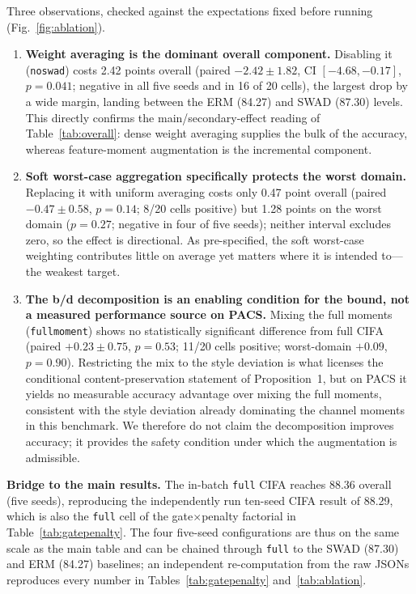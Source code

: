 \documentclass[electronics,article,submit,moreauthors]{Definitions/mdpi}
\newcommand{\add}[1]{\textcolor{addblue}{#1}}
\newcommand{\del}[1]{\textcolor{delred}{\st{#1}}}
\def\add#1{#1}%
\def\del#1{}%
\renewcommand{\add}[1]{#1}
\renewcommand{\del}[1]{}
\begin{document}
Three observations, checked against the expectations fixed before running (Fig.~\ref{fig:ablation}).
\begin{enumerate}
\item \textbf{Weight averaging is the dominant overall component.} Disabling it (\texttt{noswad}) costs 2.42 points overall (paired $-2.42\pm1.82$, CI $[-4.68,-0.17]$, $p=0.041$; negative in all five seeds and in 16 of 20 cells), the largest drop by a wide margin, landing between the ERM (84.27) and SWAD (87.30) levels. This directly confirms the main/secondary-effect reading of Table~\ref{tab:overall}: dense weight averaging supplies the bulk of the accuracy, whereas feature-moment augmentation is the incremental component.
\item \textbf{Soft worst-case aggregation specifically protects the worst domain.} Replacing it with uniform averaging costs only 0.47 point overall (paired $-0.47\pm0.58$, $p=0.14$; 8/20 cells positive) but 1.28 points on the worst domain ($p=0.27$; negative in four of five seeds); neither interval excludes zero, so the effect is directional. As pre-specified, the soft worst-case weighting contributes little on average yet matters where it is intended to---the weakest target.
\item \textbf{The b/d decomposition is an \del{prerequisite}\add{enabling condition} for the bound, not a measured performance source on PACS.} Mixing the full moments (\texttt{fullmoment}) shows no statistically significant difference from full CIFA (paired $+0.23\pm0.75$, $p=0.53$; 11/20 cells positive; worst-domain $+0.09$, $p=0.90$). Restricting the mix to the style deviation is what licenses the conditional content-preservation statement of Proposition~1, but on PACS it yields no measurable accuracy advantage over mixing the full moments, consistent with the style deviation already dominating the channel moments in this benchmark. We therefore do not claim the decomposition improves accuracy; it provides the safety condition under which the augmentation is admissible.
\end{enumerate}

\textbf{Bridge to the main results.} The in-batch \texttt{full} CIFA reaches 88.36 overall (five seeds), reproducing the independently run ten-seed CIFA result of 88.29, which is also the \texttt{full} cell of the gate$\times$penalty factorial in Table~\ref{tab:gatepenalty}. The four five-seed configurations are thus on the same scale as the main table and can be chained through \texttt{full} to the SWAD (87.30) and ERM (84.27) baselines; an independent re-computation from the raw JSONs reproduces every number in Tables~\ref{tab:gatepenalty} and~\ref{tab:ablation}.
\end{document}
